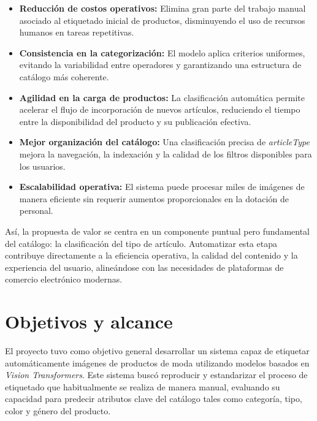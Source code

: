 \begin{itemize}
    \item \textbf{Reducción de costos operativos:} Elimina gran parte del trabajo manual asociado al etiquetado inicial de productos, disminuyendo el uso de recursos humanos en tareas repetitivas.
    
    \item \textbf{Consistencia en la categorización:} El modelo aplica criterios uniformes, evitando la variabilidad entre operadores y garantizando una estructura de catálogo más coherente.
    
    \item \textbf{Agilidad en la carga de productos:} La clasificación automática permite acelerar el flujo de incorporación de nuevos artículos, reduciendo el tiempo entre la disponibilidad del producto y su publicación efectiva.
    
    \item \textbf{Mejor organización del catálogo:} Una clasificación precisa de \textit{articleType} mejora la navegación, la indexación y la calidad de los filtros disponibles para los usuarios.
    
    \item \textbf{Escalabilidad operativa:} El sistema puede procesar miles de imágenes de manera eficiente sin requerir aumentos proporcionales en la dotación de personal.
\end{itemize}

Así, la propuesta de valor se centra en un componente puntual pero fundamental del catálogo: la clasificación del tipo de artículo. Automatizar esta etapa contribuye directamente a la eficiencia operativa, la calidad del contenido y la experiencia del usuario, alineándose con las necesidades de plataformas de comercio electrónico modernas.

\section{Objetivos y alcance}

El proyecto tuvo como objetivo general desarrollar un sistema capaz de etiquetar automáticamente imágenes de productos de moda utilizando modelos basados en \textit{Vision Transformers}. Este sistema buscó reproducir y estandarizar el proceso de etiquetado que habitualmente se realiza de manera manual, evaluando su capacidad para predecir atributos clave del catálogo tales como categoría, tipo, color y género del producto.

